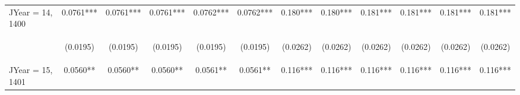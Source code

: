 \documentclass[]{article}
\begin{document}
\begin{center}
\begin{tabular}{lccccccccccc}
JYear = 14, 1400 & 0.0761*** & 0.0761*** & 0.0761*** & 0.0762*** & 0.0762*** & 0.180*** & 0.180*** & 0.181*** & 0.181*** & 0.181*** & 0.181*** \\
\vspace{4pt} & \begin{footnotesize}(0.0195)\end{footnotesize} & \begin{footnotesize}(0.0195)\end{footnotesize} & \begin{footnotesize}(0.0195)\end{footnotesize} & \begin{footnotesize}(0.0195)\end{footnotesize} & \begin{footnotesize}(0.0195)\end{footnotesize} & \begin{footnotesize}(0.0262)\end{footnotesize} & \begin{footnotesize}(0.0262)\end{footnotesize} & \begin{footnotesize}(0.0262)\end{footnotesize} & \begin{footnotesize}(0.0262)\end{footnotesize} & \begin{footnotesize}(0.0262)\end{footnotesize} & \begin{footnotesize}(0.0262)\end{footnotesize} \\
JYear = 15, 1401 & 0.0560** & 0.0560** & 0.0560** & 0.0561** & 0.0561** & 0.116*** & 0.116*** & 0.116*** & 0.116*** & 0.116*** & 0.116*** \\

\end{tabular}
\end{center}
\end{document}
